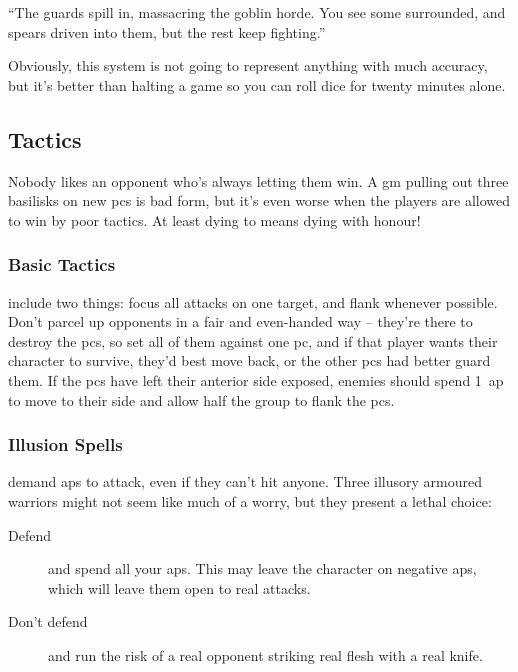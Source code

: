 \begin{multicols}{2}
\begin{exampletext}
  ``The guards spill in, massacring the goblin horde.
  You see some surrounded, and spears driven into them, but the rest keep fighting.''

\end{exampletext}

Obviously, this system is not going to represent anything with much accuracy, but it's better than halting a game so you can roll dice for twenty minutes alone.

\subsection{Tactics}

Nobody likes an opponent who's always letting them win.
A \gls{gm} pulling out three \glspl{basilisk} on new \glspl{pc} is bad form, but it's even worse when the players are allowed to win by poor tactics.
At least dying to  means dying with honour!

\subsubsection{Basic Tactics}
include two things: focus all attacks on one target, and flank whenever possible.
Don't parcel up opponents in a fair and even-handed way -- they're there to destroy the \glspl{pc}, so set all of them against one \gls{pc}, and if that player wants their character to survive, they'd best move back, or the other \glspl{pc} had better guard them.%
If the \glspl{pc} have left their anterior side exposed, enemies should spend 1~\gls{ap} to move to their side and allow half the group to flank the \glspl{pc}.

\subsubsection{Illusion Spells}
demand \glspl{ap} to attack, even if they can't hit anyone.
Three illusory armoured warriors might not seem like much of a worry, but they present a lethal choice:

\begin{description}
  \item[Defend]
  and spend all your \glspl{ap}.
  This may leave the character on negative \glspl{ap}, which will leave them open to real attacks.
  \item[Don't defend]
  and run the risk of a real opponent striking real flesh with a real knife. 
\end{description}


\end{multicols}
